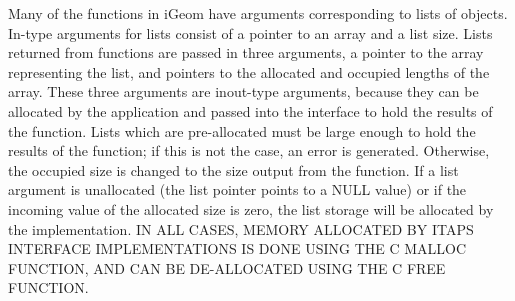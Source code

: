 Many of the functions in i\+Geom have arguments corresponding to lists of objects. In-\/type arguments for lists consist of a pointer to an array and a list size. Lists returned from functions are passed in three arguments, a pointer to the array representing the list, and pointers to the allocated and occupied lengths of the array. These three arguments are inout-\/type arguments, because they can be allocated by the application and passed into the interface to hold the results of the function. Lists which are pre-\/allocated must be large enough to hold the results of the function; if this is not the case, an error is generated. Otherwise, the occupied size is changed to the size output from the function. If a list argument is unallocated (the list pointer points to a N\+U\+LL value) or if the incoming value of the allocated size is zero, the list storage will be allocated by the implementation. IN A\+LL C\+A\+S\+ES, M\+E\+M\+O\+RY A\+L\+L\+O\+C\+A\+T\+ED BY I\+T\+A\+PS I\+N\+T\+E\+R\+F\+A\+CE I\+M\+P\+L\+E\+M\+E\+N\+T\+A\+T\+I\+O\+NS IS D\+O\+NE U\+S\+I\+NG T\+HE C M\+A\+L\+L\+OC F\+U\+N\+C\+T\+I\+ON, A\+ND C\+AN BE D\+E-\/\+A\+L\+L\+O\+C\+A\+T\+ED U\+S\+I\+NG T\+HE C F\+R\+EE F\+U\+N\+C\+T\+I\+ON. 